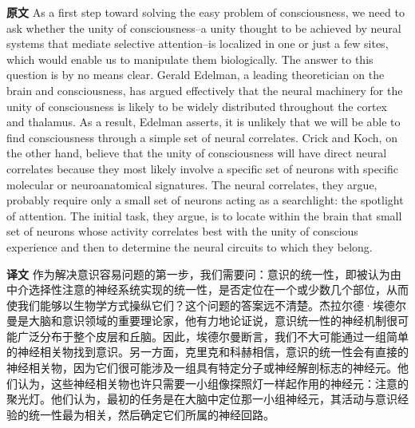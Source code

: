 \documentclass[UTF8]{ctexart}
\newenvironment{english}{\par\small\noindent\textbf{原文}\quad\ignorespaces}{\par}
\newenvironment{zhtranslation}{\par\noindent\textbf{译文}\quad\ignorespaces}{\par\vspace{0.35em}}
\begin{document}
\begin{english}
As a first step toward solving the easy problem of consciousness, we need to ask whether the unity of consciousness--a unity thought to be achieved by neural systems that mediate selective attention--is localized in one or just a few sites, which would enable us to manipulate them biologically. The answer to this question is by no means clear. Gerald Edelman, a leading theoretician on the brain and consciousness, has argued effectively that the neural machinery for the unity of consciousness is likely to be widely distributed throughout the cortex and thalamus. As a result, Edelman asserts, it is unlikely that we will be able to find consciousness through a simple set of neural correlates. Crick and Koch, on the other hand, believe that the unity of consciousness will have direct neural correlates because they most likely involve a specific set of neurons with specific molecular or neuroanatomical signatures. The neural correlates, they argue, probably require only a small set of neurons acting as a searchlight: the spotlight of attention. The initial task, they argue, is to locate within the brain that small set of neurons whose activity correlates best with the unity of conscious experience and then to determine the neural circuits to which they belong.
\end{english}
\begin{zhtranslation}
作为解决意识容易问题的第一步，我们需要问：意识的统一性，即被认为由中介选择性注意的神经系统实现的统一性，是否定位在一个或少数几个部位，从而使我们能够以生物学方式操纵它们？这个问题的答案远不清楚。杰拉尔德·埃德尔曼是大脑和意识领域的重要理论家，他有力地论证说，意识统一性的神经机制很可能广泛分布于整个皮层和丘脑。因此，埃德尔曼断言，我们不大可能通过一组简单的神经相关物找到意识。另一方面，克里克和科赫相信，意识的统一性会有直接的神经相关物，因为它们很可能涉及一组具有特定分子或神经解剖标志的神经元。他们认为，这些神经相关物也许只需要一小组像探照灯一样起作用的神经元：注意的聚光灯。他们认为，最初的任务是在大脑中定位那一小组神经元，其活动与意识经验的统一性最为相关，然后确定它们所属的神经回路。\end{zhtranslation}
\end{document}
